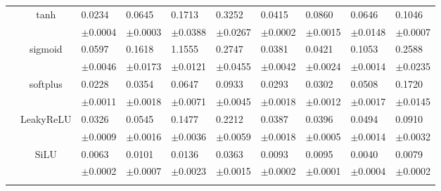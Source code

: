 \documentclass{article}
\begin{document}
\begin{table}[h!]
{\begin{tabularx}{\textwidth}{ccXXXXXXXX}
        & \multirow{2}{*}{tanh}
        & 0.0234 & 0.0645 & 0.1713 & 0.3252 & 0.0415 & 0.0860 & 0.0646 & 0.1046\\
        &&\scriptsize $\pm$0.0004 & \scriptsize $\pm$0.0003 & \scriptsize $\pm$0.0388 & \scriptsize $\pm$0.0267 & \scriptsize $\pm$0.0002 & \scriptsize $\pm$0.0015 & \scriptsize $\pm$0.0148 & \scriptsize $\pm$0.0007\\
        \cline{3-10}\rule{0pt}{2.3ex}

        & \multirow{2}{*}{sigmoid}
        & 0.0597 & 0.1618 & 1.1555 & 0.2747 & 0.0381 & 0.0421 & 0.1053 & 0.2588\\
        &&\scriptsize $\pm$0.0046 & \scriptsize $\pm$0.0173 & \scriptsize $\pm$0.0121 & \scriptsize $\pm$0.0455 & \scriptsize $\pm$0.0042 & \scriptsize $\pm$0.0024 & \scriptsize $\pm$0.0014 & \scriptsize $\pm$0.0235\\
        \cline{3-10}\rule{0pt}{2.3ex}

        & \multirow{2}{*}{softplus}
        & 0.0228 & 0.0354 & 0.0647 & 0.0933 & 0.0293 & 0.0302 & 0.0508 & 0.1720\\
        &&\scriptsize $\pm$0.0011 & \scriptsize $\pm$0.0018 & \scriptsize $\pm$0.0071 & \scriptsize $\pm$0.0045 & \scriptsize $\pm$0.0018 & \scriptsize $\pm$0.0012 & \scriptsize $\pm$0.0017 & \scriptsize $\pm$0.0145\\
        \cline{3-10}\rule{0pt}{2.3ex}

        & \multirow{2}{*}{LeakyReLU}
        & 0.0326 & 0.0545 & 0.1477 & 0.2212 & 0.0387 & 0.0396 & 0.0494 & 0.0910\\
        &&\scriptsize $\pm$0.0009 & \scriptsize $\pm$0.0016 & \scriptsize $\pm$0.0036 & \scriptsize $\pm$0.0059 & \scriptsize $\pm$0.0018 & \scriptsize $\pm$0.0005 & \scriptsize $\pm$0.0014 & \scriptsize $\pm$0.0032\\

        \hline\rule{0pt}{2.3ex}
    

        \multirow{14}{*}{\textsf{MAE\textsubscript{ef}}} 

        & \multirow{2}{*}{SiLU}
        & 0.0063 & 0.0101 & 0.0136 & 0.0363 & 0.0093 & 0.0095 & 0.0040 & 0.0079\\
        &&\scriptsize $\pm$0.0002 & \scriptsize $\pm$0.0007 & \scriptsize $\pm$0.0023 & \scriptsize $\pm$0.0015 & \scriptsize $\pm$0.0002 & \scriptsize $\pm$0.0001 & \scriptsize $\pm$0.0004 & \scriptsize $\pm$0.0002\\
        \cline{3-10}\rule{0pt}{2.3ex}


\end{tabularx}}
\end{table}
\end{document}
